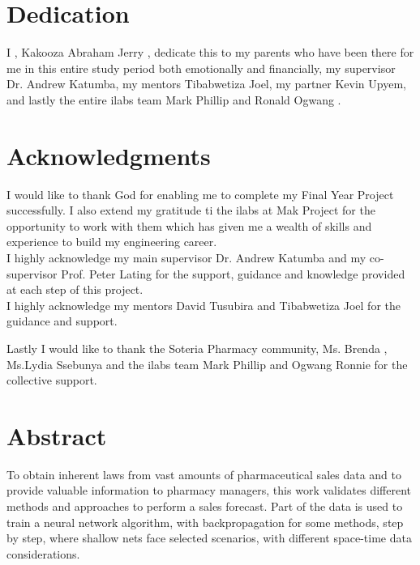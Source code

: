 \documentclass[12pt]{report}
\begin{document}
\newpage


\section*{Dedication}

\vspace{2cm}
\begin{center}
I , Kakooza Abraham Jerry , dedicate this to my parents who have been there for me in this entire study period both emotionally and financially, my supervisor Dr. Andrew Katumba, my mentors Tibabwetiza Joel, my partner Kevin Upyem, and lastly the entire ilabs team Mark Phillip and Ronald Ogwang .
\end{center}



\newpage

\section*{Acknowledgments}
I would like to thank God for enabling me to complete my Final Year Project successfully. I also extend my gratitude ti the ilabs at Mak Project for the opportunity to work with them which has given me a wealth of skills and experience to build my engineering career.\\

I highly acknowledge my main supervisor Dr. Andrew Katumba and my co-supervisor Prof. Peter Lating for the support, guidance and knowledge provided at each step of this project.\\
I highly acknowledge my mentors David Tusubira and Tibabwetiza Joel for the guidance and support.

Lastly I would like to thank the Soteria Pharmacy community, Ms. Brenda , Ms.Lydia Ssebunya and the ilabs team Mark Phillip and Ogwang Ronnie for the collective support. 

\newpage



\section*{Abstract}


To obtain inherent laws from vast amounts of pharmaceutical sales data and to provide valuable information to pharmacy managers, this work validates different methods and approaches to perform a sales forecast. Part of the data is used to train a neural network algorithm, with backpropagation for some methods, step by step, where shallow nets face selected scenarios, with different space-time data considerations. 
\end{document}
